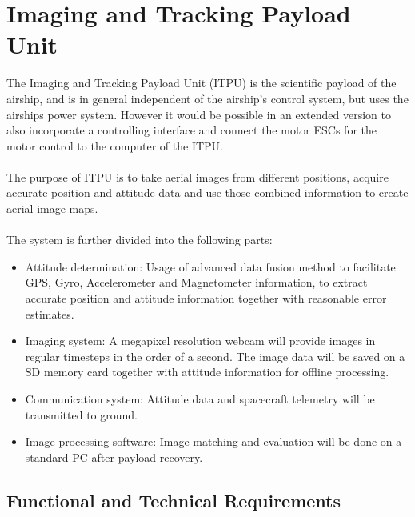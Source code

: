 \chapter{Imaging and Tracking Payload Unit}
\label{chap:itpu}

The Imaging and Tracking Payload Unit (ITPU) is the scientific payload of the
airship, and is in general independent of the airship's control system, but uses
the airships power system. However it would be possible in an extended version
to also incorporate a controlling interface and connect the motor ESCs for the
motor control to the computer of the ITPU. 
\\
\\
The purpose of ITPU is to take aerial images from different positions, acquire
accurate position and attitude data and use those combined information to create
aerial image maps. 
\\
\\
The system is further divided into the following parts:
\begin{itemize}
\item Attitude determination: Usage of advanced data fusion method to facilitate
GPS, Gyro, Accelerometer and Magnetometer information, to extract accurate
position and attitude information together with reasonable error estimates.
\item Imaging system: A megapixel resolution webcam will provide images in
regular timesteps in the order of a second.
The image data will be saved on a SD memory card together with attitude
information for offline processing.
\item Communication system: Attitude data and spacecraft telemetry will be
transmitted to ground.
\item Image processing software:
Image matching and evaluation will be done on a standard PC after payload
recovery.
\end{itemize}

\section{Functional and Technical Requirements}


